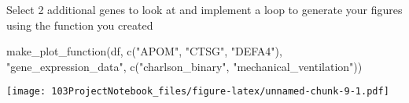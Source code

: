 \documentclass[
]{article}
\newenvironment{Shaded}{\begin{snugshade}}{\end{snugshade}}
\newcommand{\FunctionTok}[1]{\textcolor[rgb]{0.00,0.00,0.00}{#1}}
\newcommand{\NormalTok}[1]{#1}
\newcommand{\StringTok}[1]{\textcolor[rgb]{0.31,0.60,0.02}{#1}}
\begin{document}
Select 2 additional genes to look at and implement a loop to generate
your figures using the function you created

\begin{Shaded}
\begin{Highlighting}[]
\FunctionTok{make\_plot\_function}\NormalTok{(df, }\FunctionTok{c}\NormalTok{(}\StringTok{"APOM"}\NormalTok{, }\StringTok{"CTSG"}\NormalTok{, }\StringTok{"DEFA4"}\NormalTok{), }\StringTok{"gene\_expression\_data"}\NormalTok{, }\FunctionTok{c}\NormalTok{(}\StringTok{"charlson\_binary"}\NormalTok{, }\StringTok{"mechanical\_ventilation"}\NormalTok{))}
\end{Highlighting}
\end{Shaded}

\texttt{[image: 103ProjectNotebook\_files/figure-latex/unnamed-chunk-9-1.pdf]}
\end{document}
